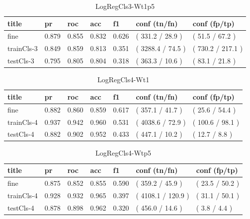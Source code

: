 \documentclass[ms]{nuthesis}
\begin{document}
\FloatBarrier
\begin{table}[H]
\centering
\begin{tabular}{|l||l||l||l||l||l||l|}\toprule
title & pr & roc & acc & f1 & conf (tn/fn) & conf (fp/tp) \\ \midrule
fine & 0.879 & 0.855 & 0.832 & 0.626 & ( 331.2 / 28.9 ) & ( 51.5 / 67.2 ) \\
trainCls-3 & 0.849 & 0.859 & 0.813 & 0.351 & ( 3288.4 / 74.5 ) & ( 730.2 / 217.1 ) \\
testCls-3 & 0.795 & 0.805 & 0.804 & 0.318 & ( 363.3 / 10.6 ) & ( 83.1 / 21.8 ) \\ \bottomrule
\end{tabular}
\caption{LogRegCls3-Wt1p5}
\label{tab:LogRegCls3-Wt1p5}
\end{table}
\FloatBarrier



\FloatBarrier
\begin{table}[H]
\centering
\begin{tabular}{|l||l||l||l||l||l||l|}\toprule
title & pr & roc & acc & f1 & conf (tn/fn) & conf (fp/tp) \\ \midrule
fine & 0.882 & 0.860 & 0.859 & 0.617 & ( 357.1 / 41.7 ) & ( 25.6 / 54.4 ) \\
trainCls-4 & 0.937 & 0.942 & 0.960 & 0.531 & ( 4038.6 / 72.9 ) & ( 100.6 / 98.1 ) \\
testCls-4 & 0.882 & 0.902 & 0.952 & 0.433 & ( 447.1 / 10.2 ) & ( 12.7 / 8.8 ) \\ \bottomrule
\end{tabular}
\caption{LogRegCls4-Wt1}
\label{tab:LogRegCls4-Wt1}
\end{table}
\FloatBarrier

\FloatBarrier
\begin{table}[H]
\centering
\begin{tabular}{|l||l||l||l||l||l||l|}\toprule
title & pr & roc & acc & f1 & conf (tn/fn) & conf (fp/tp) \\ \midrule
fine & 0.875 & 0.852 & 0.855 & 0.590 & ( 359.2 / 45.9 ) & ( 23.5 / 50.2 ) \\
trainCls-4 & 0.928 & 0.932 & 0.965 & 0.397 & ( 4108.1 / 120.9 ) & ( 31.1 / 50.1 ) \\
testCls-4 & 0.878 & 0.898 & 0.962 & 0.320 & ( 456.0 / 14.6 ) & ( 3.8 / 4.4 ) \\ \bottomrule
\end{tabular}
\caption{LogRegCls4-Wtp5}
\label{tab:LogRegCls4-Wtp5}
\end{table}
\FloatBarrier
\end{document}
